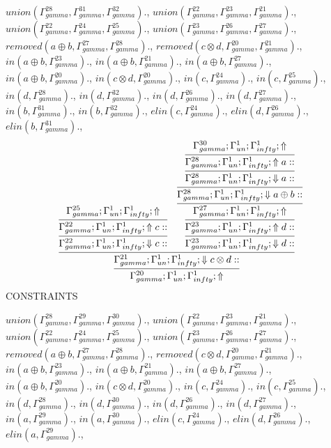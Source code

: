 \documentclass[a4paper, 11pt]{article}
\begin{document}
$union(\Gamma_{gamma}^{28}, \Gamma_{gamma}^{31}, \Gamma_{gamma}^{32}).$, $union(\Gamma_{gamma}^{22}, \Gamma_{gamma}^{23}, \Gamma_{gamma}^{21}).$, $union(\Gamma_{gamma}^{22}, \Gamma_{gamma}^{24}, \Gamma_{gamma}^{25}).$, $union(\Gamma_{gamma}^{23}, \Gamma_{gamma}^{26}, \Gamma_{gamma}^{27}).$, $removed(a \oplus b, \Gamma_{gamma}^{27}, \Gamma_{gamma}^{28}).$, $removed(c \otimes d, \Gamma_{gamma}^{20}, \Gamma_{gamma}^{21}).$, $in(a \oplus b, \Gamma_{gamma}^{23}).$, $in(a \oplus b, \Gamma_{gamma}^{21}).$, $in(a \oplus b, \Gamma_{gamma}^{27}).$, $in(a \oplus b, \Gamma_{gamma}^{20}).$, $in(c \otimes d, \Gamma_{gamma}^{20}).$, $in(c, \Gamma_{gamma}^{24}).$, $in(c, \Gamma_{gamma}^{25}).$, $in(d, \Gamma_{gamma}^{28}).$, $in(d, \Gamma_{gamma}^{32}).$, $in(d, \Gamma_{gamma}^{26}).$, $in(d, \Gamma_{gamma}^{27}).$, $in(b, \Gamma_{gamma}^{31}).$, $in(b, \Gamma_{gamma}^{32}).$, $elin(c, \Gamma_{gamma}^{24}).$, $elin(d, \Gamma_{gamma}^{26}).$, $elin(b, \Gamma_{gamma}^{31}).$, 
{\small
\[
\infer{\Gamma_{ gamma}^{20} ; \Gamma_{un}^{1} ; \Gamma_{ infty}^{1} ;  \Uparrow }
{\infer{\Gamma_{ gamma}^{21} ; \Gamma_{un}^{1} ; \Gamma_{ infty}^{1} ;  \Downarrow c \otimes d :: }
{\infer{\Gamma_{ gamma}^{22} ; \Gamma_{un}^{1} ; \Gamma_{ infty}^{1} ;  \Downarrow c :: }
{\infer{\Gamma_{ gamma}^{22} ; \Gamma_{un}^{1} ; \Gamma_{ infty}^{1} ;  \Uparrow c :: }
{\Gamma_{ gamma}^{25} ; \Gamma_{un}^{1} ; \Gamma_{ infty}^{1} ;  \Uparrow }}
&
\infer{\Gamma_{ gamma}^{23} ; \Gamma_{un}^{1} ; \Gamma_{ infty}^{1} ;  \Downarrow d :: }
{\infer{\Gamma_{ gamma}^{23} ; \Gamma_{un}^{1} ; \Gamma_{ infty}^{1} ;  \Uparrow d :: }
{\infer{\Gamma_{ gamma}^{27} ; \Gamma_{un}^{1} ; \Gamma_{ infty}^{1} ;  \Uparrow }
{\infer{\Gamma_{ gamma}^{28} ; \Gamma_{un}^{1} ; \Gamma_{ infty}^{1} ;  \Downarrow a \oplus b :: }
{\infer{\Gamma_{ gamma}^{28} ; \Gamma_{un}^{1} ; \Gamma_{ infty}^{1} ;  \Downarrow a :: }
{\infer{\Gamma_{ gamma}^{28} ; \Gamma_{un}^{1} ; \Gamma_{ infty}^{1} ;  \Uparrow a :: }
{\Gamma_{ gamma}^{30} ; \Gamma_{un}^{1} ; \Gamma_{ infty}^{1} ;  \Uparrow }}}}}}}}
\]
}
CONSTRAINTS

$union(\Gamma_{gamma}^{28}, \Gamma_{gamma}^{29}, \Gamma_{gamma}^{30}).$, $union(\Gamma_{gamma}^{22}, \Gamma_{gamma}^{23}, \Gamma_{gamma}^{21}).$, $union(\Gamma_{gamma}^{22}, \Gamma_{gamma}^{24}, \Gamma_{gamma}^{25}).$, $union(\Gamma_{gamma}^{23}, \Gamma_{gamma}^{26}, \Gamma_{gamma}^{27}).$, $removed(a \oplus b, \Gamma_{gamma}^{27}, \Gamma_{gamma}^{28}).$, $removed(c \otimes d, \Gamma_{gamma}^{20}, \Gamma_{gamma}^{21}).$, $in(a \oplus b, \Gamma_{gamma}^{23}).$, $in(a \oplus b, \Gamma_{gamma}^{21}).$, $in(a \oplus b, \Gamma_{gamma}^{27}).$, $in(a \oplus b, \Gamma_{gamma}^{20}).$, $in(c \otimes d, \Gamma_{gamma}^{20}).$, $in(c, \Gamma_{gamma}^{24}).$, $in(c, \Gamma_{gamma}^{25}).$, $in(d, \Gamma_{gamma}^{28}).$, $in(d, \Gamma_{gamma}^{30}).$, $in(d, \Gamma_{gamma}^{26}).$, $in(d, \Gamma_{gamma}^{27}).$, $in(a, \Gamma_{gamma}^{29}).$, $in(a, \Gamma_{gamma}^{30}).$, $elin(c, \Gamma_{gamma}^{24}).$, $elin(d, \Gamma_{gamma}^{26}).$, $elin(a, \Gamma_{gamma}^{29}).$,
\end{document}
